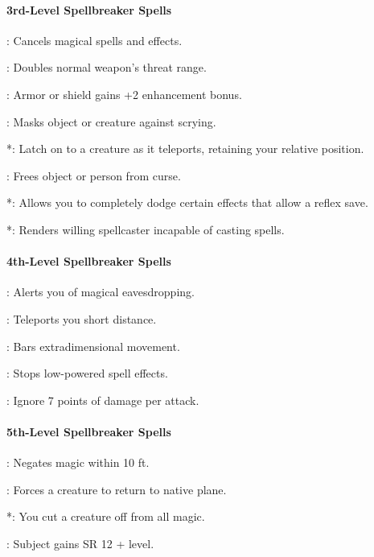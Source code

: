 \paragraph{3rd-Level Spellbreaker Spells}
\begin{list}{}{\leftmargin=1em}
  \item {}: Cancels magical spells and effects.
  \item {}: Doubles normal weapon's threat range.
  \item {}: Armor or shield gains +2 enhancement bonus.
  \item {}: Masks object or creature against scrying.
  \item {}*: Latch on to a creature as it teleports, retaining your relative position.
  \item {}: Frees object or person from curse.
  \item {}*: Allows you to completely dodge certain effects that allow a reflex save.
  \item {}*: Renders willing spellcaster incapable of casting spells.
\end{list}
\paragraph{4th-Level Spellbreaker Spells}
\begin{list}{}{\leftmargin=1em}
  \item {}: Alerts you of magical eavesdropping.
  \item {}: Teleports you short distance.
  \item {}: Bars extradimensional movement.
  \item {}: Stops low-powered spell effects.
  \item {}: Ignore 7 points of damage per attack.
\end{list}
\paragraph{5th-Level Spellbreaker Spells}
\begin{list}{}{\leftmargin=1em}
  \item {}: Negates magic within 10 ft.
  \item {}: Forces a creature to return to native plane.
  \item {}*: You cut a creature off from all magic.
  \item {}: Subject gains SR 12 + level.
\end{list}

